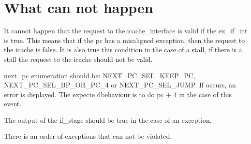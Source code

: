 \section{What can not happen}
It cannot happen that the request to the icache\_interface is valid if the ex\_if\_int is true. This means that if the pc has a misaligned exception, then the request to the icache is false. It is also true this condition in the case of a stall, if there is a stall the request to the icache should not be valid.

next\_pc enumeration should be: NEXT\_PC\_SEL\_KEEP\_PC, NEXT\_PC\_SEL\_BP\_OR\_PC\_4 or NEXT\_PC\_SEL\_JUMP. If occurs, an error is displayed. The expecte dbehaviour is to do pc + 4 in the case of this event.

The output of the if\_stage should be true in the case of an exception.

There is an order of exceptions that can not be violated.

    